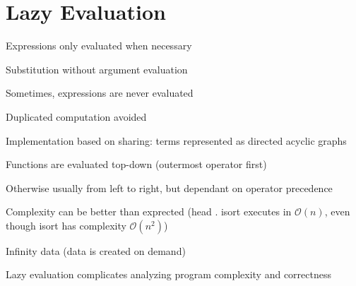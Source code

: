 \section{Lazy Evaluation}
\enumstart
	\item Expressions only evaluated when necessary
	\item Substitution without argument evaluation
	\item Sometimes, expressions are never evaluated
	\item Duplicated computation avoided
	\item Implementation based on sharing: terms represented as directed acyclic graphs
	\item Functions are evaluated top-down (outermost operator first)
	\item Otherwise usually from left to right, but dependant on operator precedence
	\item Complexity can be better than exprected (head . isort executes in $\mathcal{O}(n)$, even though isort has complexity $\mathcal{O}(n^2)$)
	\item Infinity data (data is created on demand)
	\item Lazy evaluation complicates analyzing program complexity and correctness
\enumend
